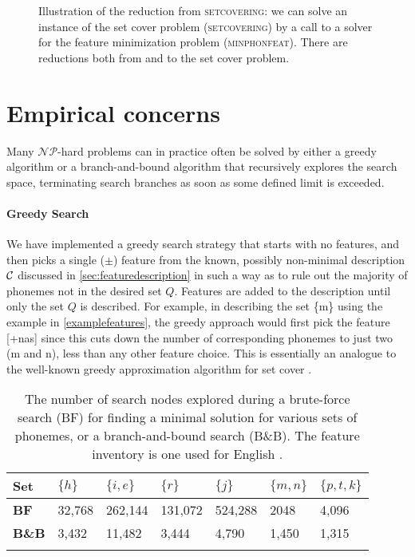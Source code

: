 \documentclass[11pt,a4paper]{article}
\begin{document}
\begin{figure}
\begin{center}
\end{center}
\caption{Illustration of the reduction from \textsc{setcovering}: we can solve an instance of the set cover problem (\textsc{setcovering}) by a call to a solver for the feature minimization problem (\textsc{minphonfeat}).  There are reductions both from and to the set cover problem.}
\label{reductionillustration}
\end{figure}

\section{Empirical concerns}

Many $\mathcal{NP}$-hard problems can in practice often be solved by either a greedy algorithm \cite{chvatal1979} or a branch-and-bound algorithm \cite{land1960} that recursively explores the search space, terminating search branches as soon as some defined limit is exceeded.

\paragraph{Greedy Search} We have implemented a greedy search strategy that starts with no features, and then picks a single ($\pm$) feature from the known, possibly non-minimal description $\mathcal{C}$ discussed in \cref{sec:featuredescription} in such a way as to rule out the majority of phonemes not in the desired set $Q$. Features are added to the description until only the set $Q$ is described. For example, in describing the set \{m\} using the example in \cref{examplefeatures}, the greedy approach would first pick the feature [+nas] since this cuts down the number of corresponding phonemes to just two (m and n), less than any other feature choice. This is essentially an analogue to the well-known greedy approximation algorithm for set cover \cite{chvatal1979}. 

\begin{table*}
\begin{center}
\begin{tabular}{lllllll}
\toprule
\textbf{Set} & $\{h\}$ & $\{i,e\}$  &  $\{r\}$   &   $\{j\}$  &  $\{m,n\}$ &  $\{p,t,k\}$ \\
\midrule
\textbf{BF} & 32,768 & 262,144 & 131,072 & 524,288 & 2048  &  4,096 \\
\textbf{B\&B} & 3,432  & 11,482  &  3,444  &  4,790  & 1,450   &  1,315 \\
\bottomrule
\\
\end{tabular}
\end{center}
\caption{The number of search nodes explored during a brute-force search (BF) for finding a minimal solution for various sets of phonemes, or a branch-and-bound search (B\&B). The feature inventory is one used for English \cite{vanvugt2012,hayes2011}.}
\label{searchspace}
\end{table*}
\end{document}
